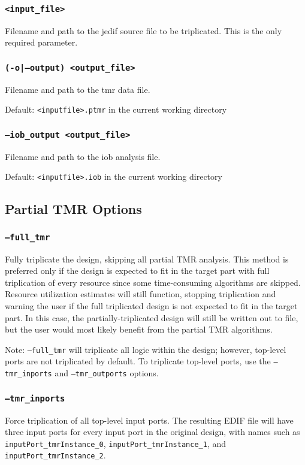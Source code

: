 \subsubsection{\texttt{<input\_file>}}
Filename and path to the jedif source file to be
triplicated. This is the only required parameter.

\subsubsection{\texttt{(-o|--output) <output\_file>}}
Filename and path to the tmr data file.

Default: \texttt{<inputfile>.ptmr} in the current working directory

\subsubsection{\texttt{--iob\_output <output\_file>}}
Filename and path to the iob analysis file.

Default: \texttt{<inputfile>.iob} in the current working directory

\subsection{Partial TMR Options}

\subsubsection{\texttt{--full\_tmr}}
Fully triplicate the design, skipping all partial TMR analysis. This method is 
preferred only if the design is expected to fit in the target part with full 
triplication of every resource since some time-consuming algorithms are skipped.
Resource utilization estimates will still function, stopping triplication and 
warning the user if the full triplicated design is not expected to fit in the 
target part. In this case, the partially-triplicated design will still be 
written out to file, but the user would most likely benefit from the partial 
TMR algorithms.

Note: \texttt{--full\_tmr} will triplicate all logic within the design; however, 
top-level ports are not triplicated by default. To triplicate top-level ports,
use the \texttt{--tmr\_in\-ports} and \texttt{--tmr\_outports} options.

\subsubsection{\texttt{--tmr\_inports}}
Force triplication of all top-level input ports. The resulting EDIF file will
have three input ports for every input port in the original design, with names
such as \texttt{inputPort\_tmrInstance\_0}, \texttt{inputPort\_tmrInstance\_1},
and \texttt{inputPort\_tmrInstance\_2}.

